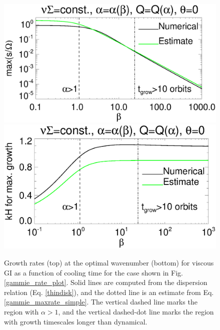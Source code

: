 \begin{figure}
  \includegraphics[width=\linewidth,clip=true,trim=0cm 1.5cm 0.cm
    0.0cm]{figures/result2d_gvisc}
  \includegraphics[width=\linewidth,clip=true,trim=0cm 0cm 0.cm
    1.0cm]{figures/result2d_gvisc_kmax}
  \caption{Growth rates (top) at the optimal wavenumber (bottom) for
    viscous GI as a function of cooling time for the
    case shown in Fig. \ref{gammie_rate_plot}. Solid lines are
    computed from the dispersion relation (Eq. \ref{thindisk}), and the dotted line is an
    estimate from Eq. \ref{gammie_maxrate_simple}. The vertical dashed
    line marks the region with $\alpha > 1$, and the vertical
    dashed-dot line marks the region with growth timescales longer
    than dynamical. 
    \label{gammie_maxrate_plot}}
\end{figure}
